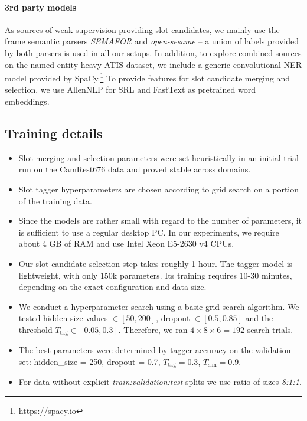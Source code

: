 \paragraph{3rd party models}
As sources of weak supervision providing slot candidates, we mainly use the frame semantic parsers \textit{SEMAFOR} \cite{das2010semafor} and \textit{open-sesame} \cite{swayamdipta2017frame} -- a union of labels provided by both parsers is used in all our setups. In addition, to explore combined sources on the named-entity-heavy ATIS dataset, we include a generic convolutional NER model provided by SpaCy.\footnote{\url{https://spacy.io}}
To provide features for slot candidate merging and selection, we use AllenNLP \cite{Gardner2017AllenNLP} for SRL
and FastText \cite{bojanowski2017enriching} as pretrained word embeddings.

\subsection{Training details}
\begin{itemize}
    \item Slot merging and selection parameters were set heuristically in an initial trial run on the CamRest676 data and proved stable across domains.
    \item Slot tagger hyperparameters are chosen according to grid search on a portion of the training data.
    \item Since the models are rather small with regard to the number of parameters, it is sufficient to use a regular desktop PC. In our experiments, we require about 4 GB of RAM and use Intel Xeon E5-2630 v4 CPUs. 
    \item Our slot candidate selection step takes roughly 1 hour.
    The tagger model is lightweight, with only 150k parameters. Its training requires 10-30 minutes, depending on the exact configuration and data size.
    \item We conduct a hyperparameter search using a basic grid search algorithm. We tested hidden size values $\in [50,200]$, dropout $\in [0.5,0.85]$ and the threshold $T_{\text{tag}} \in [0.05,0.3]$. Therefore, we ran $4\times8\times6 = 192$ search trials.
    \item The best parameters were determined by tagger accuracy on the validation set: hidden\_size = 250, dropout = 0.7, $T_{\text{tag}} = 0.3$, $T_{\text{sim}} = 0.9$.
    \item For data without explicit \emph{train:validation:test} splits we use ratio of sizes \emph{8:1:1}.
\end{itemize}

